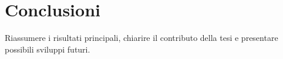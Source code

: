 \chapter{Conclusioni}
\label{chap:conclusions}

Riassumere i risultati principali, chiarire il contributo della tesi e
presentare possibili sviluppi futuri.
